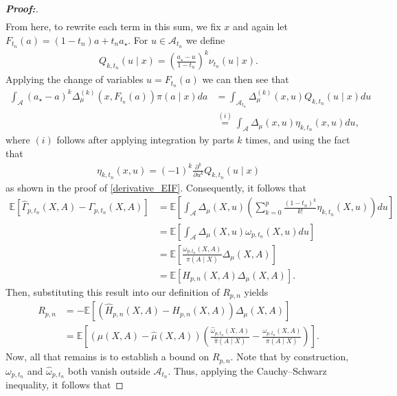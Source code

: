 \documentclass[10pt,a4paper]{amsart}
\begin{document}
\begin{proof}[\textbf{Proof:}]
\begin{align*}
\end{align*}
From here, to rewrite each term in this sum, we fix $x$ and again let $F_{t_n}(a) = (1-t_n)a+t_na_\star$. For $u\in\mathcal{A}_{t_n}$ we define
\begin{align*}
     Q_{k,t_n}(u\mid x) = \left(\frac{a_\star-u}{1-t_n} \right)^k \nu_{t_n}(u\mid x).
\end{align*}
Applying the change of variables $u=F_{t_n}(a)$ we can then see that 
\begin{align*}
    \int_{\mathcal{A}} (a_\star-a)^k \Delta_\mu^{(k)} \!\left(x,F_{t_n}(a)\right) \pi(a\mid x) da &= \int_{\mathcal{A}_{t_n}} \Delta_\mu^{(k)}(x,u) Q_{k,t_n}(u\mid x)du \\
    &\overset{(i)}{=}  \int_{\mathcal{A}} \Delta_\mu(x,u) \eta_{k,t_n}(x,u)du,
\end{align*}
where $(i)$ follows after applying integration by parts $k$ times, and using the fact that
\begin{align*}
     \eta_{k,t_n}(x,u) = (-1)^k \frac{\partial^k}{\partial u^k} Q_{k,t_n}(u\mid x)
\end{align*}
as shown in the proof of \cref{derivative_EIF}. Consequently, it follows that
\begin{align*}
    \mathbb{E}\!\left[ \widehat\Gamma_{p,t_n}(X,A) - \Gamma_{p,t_n}(X,A)\right] &= \mathbb{E}\!\left[\int_{\mathcal{A}} \Delta_\mu(X,u) \left(\sum_{k=0}^{p} \frac{(1-t_n)^k}{k!} \eta_{k,t_n}(X,u) \right) du \right] \\
    &=  \mathbb{E}\!\left[ \int_{\mathcal{A}} \Delta_\mu(X,u) \omega_{p,t_n}(X,u) du \right] \\
    &=  \mathbb{E}\!\left[\frac{\omega_{p,t_n}(X,A)}{\pi(A\mid X)} \Delta_\mu(X,A) \right] \\
    &= \mathbb{E}\!\left[ H_{p,n}(X,A) \Delta_\mu(X,A) \right].
\end{align*}
Then, substituting this result into our definition of $R_{p, n}$ yields
\begin{align*}
    R_{p,n} &= - \mathbb{E}\!\left[\left(\widehat H_{p,n}(X,A)-H_{p,n}(X,A)\right) \Delta_\mu(X,A) \right] \\
    &= \mathbb{E}\!\left[(\mu(X,A)-\widehat\mu(X,A))\left(\frac{\widehat\omega_{p,t_n}(X,A)}{\widehat\pi(A\mid X)} - \frac{\omega_{p,t_n}(X,A)}{\pi(A\mid X)} \right)\right].
\end{align*}
Now, all that remains is to establish a bound on $R_{p,n}$. Note that by construction, $\omega_{p,t_n}$ and $\widehat\omega_{p,t_n}$ both vanish outside
$\mathcal{A}_{t_n}$. Thus, applying the Cauchy--Schwarz inequality, it follows that

\end{proof}
\end{document}
